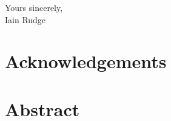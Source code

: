 \documentclass[12pt, openany, a4paper]{book}
\renewcommand{\baselinestretch}{1.5}
\begin{document}
\begin{flushright}
	Yours sincerely,\\
	\medskip
	\medskip
	\medskip
Iain Rudge
\end{flushright}

\cleardoublepage




\chapter{Acknowledgements}
\chapter{Abstract}



\singlespacing
\tableofcontents
\renewcommand{\baselinestretch}{1.5}

\listoffigures
{}

\listoftables
{}
\renewcommand{\baselinestretch}{1.5}
\onehalfspacing
% 

\newpage

\mainmatter
\end{document}
